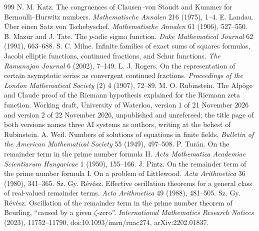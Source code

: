\begin{thebibliography}{999}
 N. M. Katz. The congruences of Clausen--von Staudt and Kummer for Bernoulli--Hurwitz numbers. \emph{Mathematische Annalen} 216 (1975), 1--4.
 E. Landau. \"Uber einen Satz von Tschebyschef. \emph{Mathematische Annalen} 61 (1906), 527--550.
 B. Mazur and J. Tate. The $p$-adic sigma function. \emph{Duke Mathematical Journal} 62 (1991), 663--688.
 S. C. Milne. Infinite families of exact sums of squares formulas, Jacobi elliptic functions, continued fractions, and Schur functions. \emph{The Ramanujan Journal} 6 (2002), 7--149.
 L. J. Rogers. On the representation of certain asymptotic series as convergent continued fractions. \emph{Proceedings of the London Mathematical Society} (2) 4 (1907), 72--89.
 M. O. Rubinstein. The Alp\"oge and Claude proof of the Riemann hypothesis explained for the Riemann zeta function. Working draft, University of Waterloo, version 1 of 21 November 2026 and version 2 of 22 November 2026, unpublished and unrefereed; the title page of both versions names three AI systems as authors, writing at the behest of Rubinstein.
 A. Weil. Numbers of solutions of equations in finite fields. \emph{Bulletin of the American Mathematical Society} 55 (1949), 497--508.
 P. Tur\'an. On the remainder term in the prime number formula II. \emph{Acta Mathematica Academiae Scientiarum Hungaricae} 1 (1950), 155--166.
 J. Pintz. On the remainder term of the prime number formula I. On a problem of Littlewood. \emph{Acta Arithmetica} 36 (1980), 341--365.
 Sz. Gy. R\'ev\'esz. Effective oscillation theorems for a general class of real-valued remainder terms. \emph{Acta Arithmetica} 49 (1988), 481--505.
 Sz. Gy. R\'ev\'esz. Oscillation of the remainder term in the prime number theorem of Beurling, ``caused by a given $\zeta$-zero''. \emph{International Mathematics Research Notices} (2023), 11752--11790, doi:10.1093/imrn/rnac274, arXiv:2202.01837.

\end{thebibliography}
